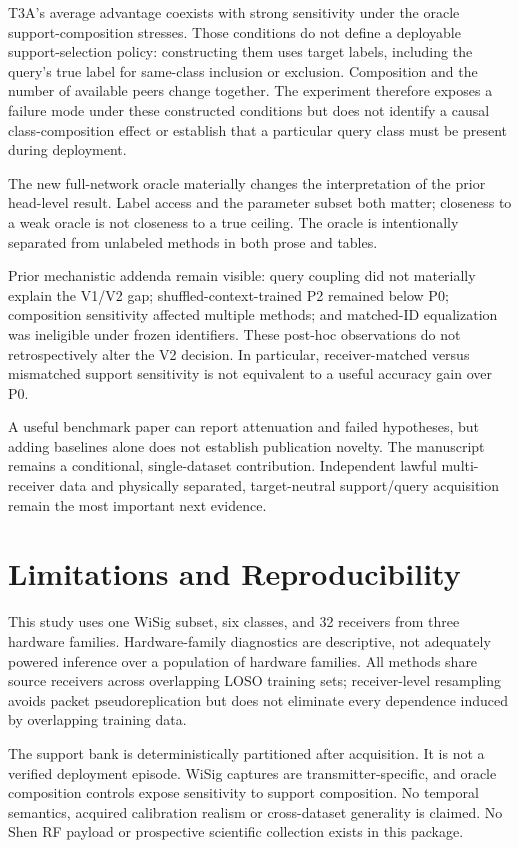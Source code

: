 T3A's average advantage coexists with strong sensitivity under the oracle support-composition stresses. Those conditions do not define a deployable support-selection policy: constructing them uses target labels, including the query's true label for same-class inclusion or exclusion. Composition and the number of available peers change together. The experiment therefore exposes a failure mode under these constructed conditions but does not identify a causal class-composition effect or establish that a particular query class must be present during deployment.

The new full-network oracle materially changes the interpretation of the prior head-level result. Label access and the parameter subset both matter; closeness to a weak oracle is not closeness to a true ceiling. The oracle is intentionally separated from unlabeled methods in both prose and tables.

Prior mechanistic addenda remain visible: query coupling did not materially explain the V1/V2 gap; shuffled-context-trained P2 remained below P0; composition sensitivity affected multiple methods; and matched-ID equalization was ineligible under frozen identifiers. These post-hoc observations do not retrospectively alter the V2 decision. In particular, receiver-matched versus mismatched support sensitivity is not equivalent to a useful accuracy gain over P0.

A useful benchmark paper can report attenuation and failed hypotheses, but adding baselines alone does not establish publication novelty. The manuscript remains a conditional, single-dataset contribution. Independent lawful multi-receiver data and physically separated, target-neutral support/query acquisition remain the most important next evidence.

\section{Limitations and Reproducibility}
This study uses one WiSig subset, six classes, and 32 receivers from three hardware families. Hardware-family diagnostics are descriptive, not adequately powered inference over a population of hardware families. All methods share source receivers across overlapping LOSO training sets; receiver-level resampling avoids packet pseudoreplication but does not eliminate every dependence induced by overlapping training data.

The support bank is deterministically partitioned after acquisition. It is not a verified deployment episode. WiSig captures are transmitter-specific, and oracle composition controls expose sensitivity to support composition. No temporal semantics, acquired calibration realism or cross-dataset generality is claimed. No Shen RF payload or prospective scientific collection exists in this package.

